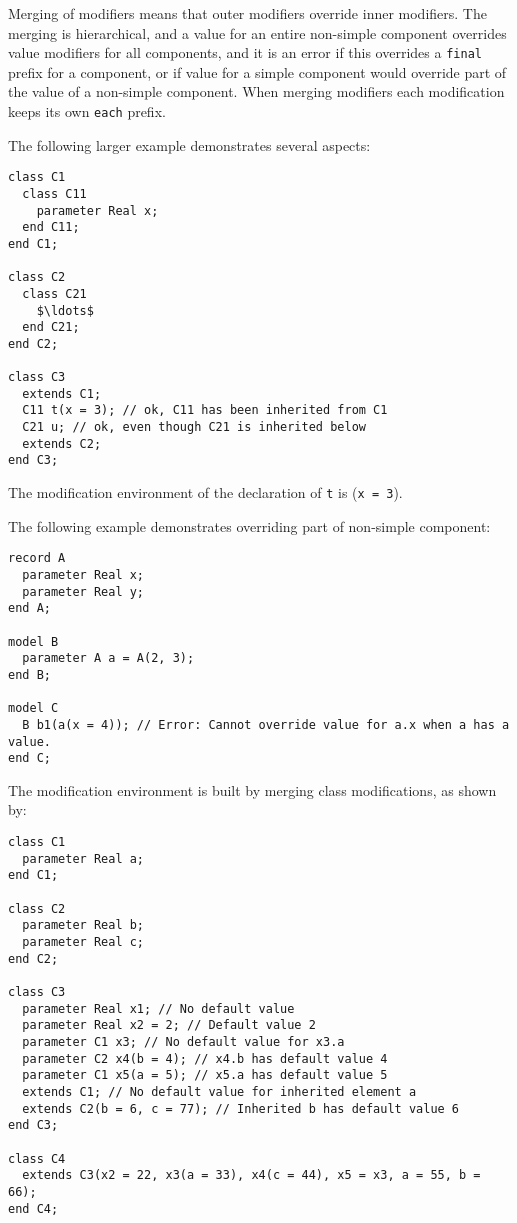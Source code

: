 Merging of modifiers means that outer modifiers override inner modifiers.
The merging is hierarchical, and a value for an entire non-simple component overrides value modifiers for all components, and it is an error if this overrides a \lstinline!final! prefix for a component, or if value for a simple component would override part of the value of a non-simple component.
When merging modifiers each modification keeps its own \lstinline!each! prefix.

\begin{example}
The following larger example demonstrates several aspects:
\begin{lstlisting}[language=modelica]
class C1
  class C11
    parameter Real x;
  end C11;
end C1;

class C2
  class C21
    $\ldots$
  end C21;
end C2;

class C3
  extends C1;
  C11 t(x = 3); // ok, C11 has been inherited from C1
  C21 u; // ok, even though C21 is inherited below
  extends C2;
end C3;
\end{lstlisting}
The modification environment of the declaration of \lstinline!t! is
(\lstinline!x = 3!).

The following example demonstrates overriding part of non-simple component:
\begin{lstlisting}[language=modelica]
record A
  parameter Real x;
  parameter Real y;
end A;

model B
  parameter A a = A(2, 3);
end B;

model C
  B b1(a(x = 4)); // Error: Cannot override value for a.x when a has a value.
end C;
\end{lstlisting}

The modification environment is built by merging class modifications, as shown by:
\begin{lstlisting}[language=modelica]
class C1
  parameter Real a;
end C1;

class C2
  parameter Real b;
  parameter Real c;
end C2;

class C3
  parameter Real x1; // No default value
  parameter Real x2 = 2; // Default value 2
  parameter C1 x3; // No default value for x3.a
  parameter C2 x4(b = 4); // x4.b has default value 4
  parameter C1 x5(a = 5); // x5.a has default value 5
  extends C1; // No default value for inherited element a
  extends C2(b = 6, c = 77); // Inherited b has default value 6
end C3;

class C4
  extends C3(x2 = 22, x3(a = 33), x4(c = 44), x5 = x3, a = 55, b = 66);
end C4;
\end{lstlisting}


\end{example}
